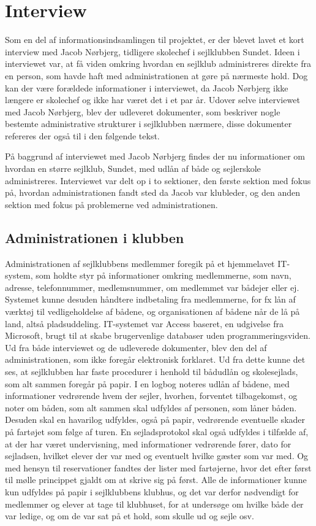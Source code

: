 \chapter{Interview}\label{bilag:interview}
Som en del af informationsindsamlingen til projektet, er der blevet lavet et kort interview med Jacob Nørbjerg, tidligere skolechef i sejlklubben Sundet. Ideen i interviewet var, at få viden omkring hvordan en sejlklub administreres direkte fra en person, som havde haft med administrationen at gøre på nærmeste hold. Dog kan der være forældede informationer i interviewet, da Jacob Nørbjerg ikke længere er skolechef og ikke har været det i et par år. Udover selve interviewet med Jacob Nørbjerg, blev der udleveret dokumenter, som beskriver nogle bestemte administrative strukturer i sejlklubben nærmere, disse dokumenter refereres der også til i den følgende tekst.

På baggrund af interviewet med Jacob Nørbjerg findes der nu informationer om hvordan en større sejlklub, Sundet, med udlån af både og sejlerskole administreres. Interviewet var delt op i to sektioner, den første sektion med fokus på, hvordan administrationen fandt sted da Jacob var klubleder, og den anden sektion med fokus på problemerne ved administrationen.
\section*{Administrationen i klubben}
Administrationen af sejlklubbens medlemmer foregik på et hjemmelavet IT-system, som holdte styr på informationer omkring medlemmerne, som navn, adresse, telefonnummer, medlemsnummer, om medlemmet var bådejer eller ej. Systemet kunne desuden håndtere indbetaling fra medlemmerne, for fx lån af værktøj til vedligeholdelse af bådene, og organisationen af bådene når de lå på land, altså pladsuddeling. IT-systemet var Access baseret, en udgivelse fra Microsoft, brugt til at skabe brugervenlige databaser uden programmeringsviden.
Ud fra både interviewet og de udleverede dokumenter, blev den del af administrationen, som ikke foregår elektronisk forklaret. Ud fra dette kunne det ses, at sejlklubben har faste procedurer i henhold til bådudlån og skolesejlads, som alt sammen foregår på papir. I en logbog noteres udlån af bådene, med informationer vedrørende hvem der sejler, hvorhen, forventet tilbagekomst, og noter om båden, som alt sammen skal udfyldes af personen, som låner båden. Desuden skal en havarilog udfyldes, også på papir, vedrørende eventuelle skader på fartøjet som følge af turen. En sejladsprotokol skal også udfyldes i tilfælde af, at der har været undervisning, med informationer vedrørende fører, dato for sejladsen, hvilket elever der var med og eventuelt hvilke gæster som var med. Og med hensyn til reservationer fandtes der lister med fartøjerne, hvor det efter først til mølle princippet gjaldt om at skrive sig på først. Alle de informationer kunne kun udfyldes på papir i sejlklubbens klubhus, og det var derfor nødvendigt for medlemmer og elever at tage til klubhuset, for at undersøge om hvilke både der var ledige, og om de var sat på et hold, som skulle ud og sejle osv. 
